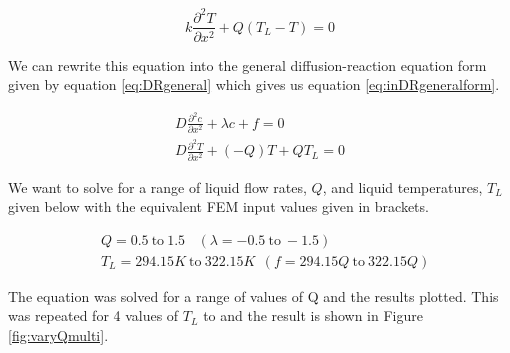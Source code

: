 \documentclass[11pt]{article}
\begin{document}
\begin{equation} \label{eq:part2analytical1}
k \frac{\partial^2 T}{\partial x^2} + Q(T_L - T) = 0
\end{equation}

We can rewrite this equation into the general diffusion-reaction equation form given by equation \ref{eq:DRgeneral} which gives us equation \ref{eq:inDRgeneralform}.

\begin{subequations}
\begin{align}
D \frac{\partial^2c}{\partial x^2} + \lambda c + f = 0 \label{eq:DRgeneral} \\
D \frac{\partial^2T}{\partial x^2} + (-Q) T + QT_L = 0 \label{eq:inDRgeneralform}
\end{align}
\end{subequations}

We want to solve for a range of liquid flow rates, $Q$, and liquid temperatures, $T_L$ given below with the equivalent FEM input values given in brackets.

\begin{align*}
&Q = 0.5 \ \text{to} \ 1.5 \ \ \ \ (\lambda = -0.5 \ \text{to} \ -1.5) \\
&T_L = 294.15K \ \text{to}\ 322.15K \ \ (f =  294.15Q \ \text{to} \ 322.15Q )
\end{align*}

The equation was solved for a range of values of Q and the results plotted. This was repeated for 4 values of $T_L$ to and the result is shown in Figure \ref{fig:varyQmulti}. \\
\clearpage
\end{document}
